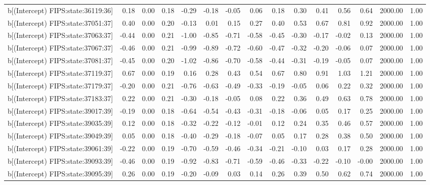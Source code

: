 \begin{table}[ht]
\begin{tabular}{rrrrrrrrrrrrrrr}
  b[(Intercept) FIPS:state:36119:36] & 0.18 & 0.00 & 0.18 & -0.29 & -0.18 & -0.05 & 0.06 & 0.18 & 0.30 & 0.41 & 0.56 & 0.64 & 2000.00 & 1.00 \\ 
  b[(Intercept) FIPS:state:37051:37] & 0.40 & 0.00 & 0.20 & -0.13 & 0.01 & 0.15 & 0.27 & 0.40 & 0.53 & 0.67 & 0.81 & 0.92 & 2000.00 & 1.00 \\ 
  b[(Intercept) FIPS:state:37063:37] & -0.44 & 0.00 & 0.21 & -1.00 & -0.85 & -0.71 & -0.58 & -0.45 & -0.30 & -0.17 & -0.02 & 0.13 & 2000.00 & 1.00 \\ 
  b[(Intercept) FIPS:state:37067:37] & -0.46 & 0.00 & 0.21 & -0.99 & -0.89 & -0.72 & -0.60 & -0.47 & -0.32 & -0.20 & -0.06 & 0.07 & 2000.00 & 1.00 \\ 
  b[(Intercept) FIPS:state:37081:37] & -0.45 & 0.00 & 0.20 & -1.02 & -0.86 & -0.70 & -0.58 & -0.44 & -0.31 & -0.19 & -0.05 & 0.07 & 2000.00 & 1.00 \\ 
  b[(Intercept) FIPS:state:37119:37] & 0.67 & 0.00 & 0.19 & 0.16 & 0.28 & 0.43 & 0.54 & 0.67 & 0.80 & 0.91 & 1.03 & 1.21 & 2000.00 & 1.00 \\ 
  b[(Intercept) FIPS:state:37179:37] & -0.20 & 0.00 & 0.21 & -0.76 & -0.63 & -0.49 & -0.33 & -0.19 & -0.05 & 0.06 & 0.22 & 0.32 & 2000.00 & 1.00 \\ 
  b[(Intercept) FIPS:state:37183:37] & 0.22 & 0.00 & 0.21 & -0.30 & -0.18 & -0.05 & 0.08 & 0.22 & 0.36 & 0.49 & 0.63 & 0.78 & 2000.00 & 1.00 \\ 
  b[(Intercept) FIPS:state:39017:39] & -0.19 & 0.00 & 0.18 & -0.64 & -0.54 & -0.43 & -0.31 & -0.18 & -0.06 & 0.05 & 0.17 & 0.25 & 2000.00 & 1.00 \\ 
  b[(Intercept) FIPS:state:39035:39] & 0.12 & 0.00 & 0.18 & -0.32 & -0.22 & -0.12 & -0.01 & 0.12 & 0.24 & 0.35 & 0.46 & 0.57 & 2000.00 & 1.00 \\ 
  b[(Intercept) FIPS:state:39049:39] & 0.05 & 0.00 & 0.18 & -0.40 & -0.29 & -0.18 & -0.07 & 0.05 & 0.17 & 0.28 & 0.38 & 0.50 & 2000.00 & 1.00 \\ 
  b[(Intercept) FIPS:state:39061:39] & -0.22 & 0.00 & 0.19 & -0.70 & -0.59 & -0.46 & -0.34 & -0.21 & -0.10 & 0.03 & 0.17 & 0.28 & 2000.00 & 1.00 \\ 
  b[(Intercept) FIPS:state:39093:39] & -0.46 & 0.00 & 0.19 & -0.92 & -0.83 & -0.71 & -0.59 & -0.46 & -0.33 & -0.22 & -0.10 & -0.00 & 2000.00 & 1.00 \\ 
  b[(Intercept) FIPS:state:39095:39] & 0.26 & 0.00 & 0.19 & -0.20 & -0.09 & 0.03 & 0.14 & 0.26 & 0.39 & 0.50 & 0.62 & 0.74 & 2000.00 & 1.00 \\ 

\end{tabular}
\end{table}
